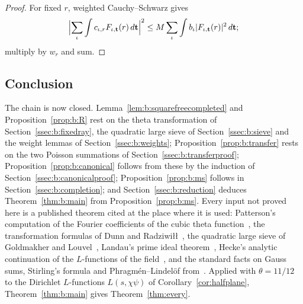 \begin{proof}
For fixed $r$, weighted Cauchy--Schwarz gives
\[
  \Bigl|\sum_\iota\int c_{\iota,r}F_{\iota,\mathbf t}(r)\,d\mathbf t\Bigr|^2\le M\sum_\iota\int b_\iota|F_{\iota,\mathbf t}(r)|^2\,d\mathbf t;
\]
multiply by $w_r$ and sum.
\end{proof}

\subsection{Conclusion}\label{ssec:b:conclusion}

The chain is now closed. Lemma~\ref{lem:b:squarefreecompleted} and Proposition~\ref{prop:b:R} rest on the theta transformation of Section~\ref{ssec:b:fixedray}, the quadratic large sieve of Section~\ref{ssec:b:sieve} and the weight lemmas of Section~\ref{ssec:b:weights}; Proposition~\ref{prop:b:transfer} rests on the two Poisson summations of Section~\ref{ssec:b:transferproof}; Proposition~\ref{prop:b:canonical} follows from these by the induction of Section~\ref{ssec:b:canonicalproof}; Proposition~\ref{prop:b:ms} follows in Section~\ref{ssec:b:completion}; and Section~\ref{ssec:b:reduction} deduces Theorem~\ref{thm:b:main} from Proposition~\ref{prop:b:ms}. Every input not proved here is a published theorem cited at the place where it is used: Patterson's computation of the Fourier coefficients of the cubic theta function~\cite{Pat77}, the transformation formulas of Dunn and Radziwi\l\l~\cite{DR}, the quadratic large sieve of Goldmakher and Louvel~\cite{GL}, Landau's prime ideal theorem~\cite{Lan03}, Hecke's analytic continuation of the $L$-functions of the field~\cite{Hec20}, and the standard facts on Gauss sums, Stirling's formula and Phragm\'en--Lindel\"of from~\cite{IK04}. Applied with $\theta=11/12$ to the Dirichlet $L$-functions $L(s,\chi\psi)$ of Corollary~\ref{cor:halfplane}, Theorem~\ref{thm:b:main} gives Theorem~\ref{thm:every}.

